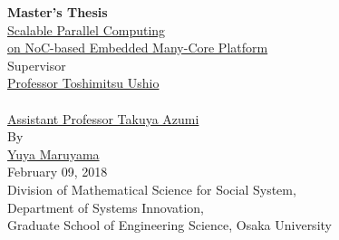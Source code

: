 \documentclass[a4j,12pt,oneside,openany,english]{jsbook}
\date{\today}
\begin{document}
\renewcommand{\headfont}{\bfseries}

\renewcommand{\baselinestretch}{1.1}

\thispagestyle{empty}
\begin{center}
  \vspace*{5mm}
  {\Huge {\bf Master's Thesis}}\\
  \vspace{2cm}
  \vspace{1cm}
  \underline{\LARGE{Scalable Parallel Computing}} \\
  \vspace{0.2cm}  
  \underline{\LARGE{on NoC-based Embedded Many-Core Platform}} \\  
  \vspace{0.5cm}
  \vspace{12mm}
  {\large Supervisor}\\
  \vspace{6mm}
  \underline{\Large Professor Toshimitsu Ushio}\\
  　\\
  \underline{\Large Assistant Professor Takuya Azumi}\\
  \vspace{8mm}
  {\large By}\\
  \vspace{6mm}
  \underline{\Large Yuya Maruyama}\\
  \vspace{10mm}
  {\Large February 09, 2018}\\  
  \vspace{14mm}
  {\Large Division of Mathematical Science for Social System,\\
    Department of Systems Innovation,\\
    Graduate School of Engineering Science, Osaka University}\\
\end{center}
\clearpage
\setcounter{page}{0}
\end{document}
